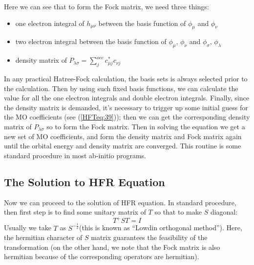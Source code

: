 Here we can see that to form the Fock matrix, we need three things:
\begin{itemize}
  \item one electron integral of $h_{\mu \nu}$ between the basis
  function of $\phi_{\mu}$ and $\phi_{\nu}$
  \item two electron integral between the basis
  function of $\phi_{\mu}$, $\phi_{\nu}$ and $\phi_{\sigma}$,
  $\phi_{\lambda}$
  \item density matrix of $P_{\lambda\sigma} =
  \sum_{j}^{occ}c_{\mu j}^{*}c_{\nu j}$
\end{itemize}

In any practical Hatree-Fock calculation, the basis sets is always
selected prior to the calculation. Then by using such fixed basis
functions, we can calculate the value for all the one electron
integrals and double electron integrals. Finally, since the density
matrix is demanded, it's necessary to trigger up some initial guess
for the MO coefficients (see (\ref{HFTeq:39})); then we
can get the corresponding density matrix of $P_{\lambda\sigma}$
so to form the Fock matrix. Then in solving the equation we get a new set of MO
coefficients, and form the density matrix and Fock matrix again until the
orbital energy and density matrix are converged. This routine is some standard
procedure in most ab-initio programs.




\subsection{The Solution to HFR Equation}
%
%
%
Now we can proceed to the solution of HFR equation. In standard
procedure, then first step is to find some unitary matrix of $T$ so
that to make $S$ diagonal:
\begin{equation}\label{}
T^{+}ST = I
\end{equation}
Usually we take $T$ as $S^{-\frac{1}{2}}$(this is known as ``Lowdin 
orthogonal method''). Here, the hermitian character of $S$ matrix guarantees the
feasibility of the transformation (on the other hand, we note that
the Fock matrix is also hermitian because of the corresponding
operators are hermitian).

